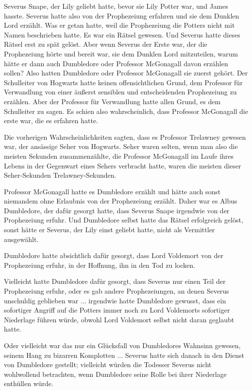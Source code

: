 Severus Snape, der Lily geliebt hatte, bevor sie Lily Potter war, und James
hasste. Severus hatte also von der Prophezeiung erfahren und sie dem Dunklen
Lord erzählt. Was er getan hatte, weil die Prophezeiung die Potters nicht mit
Namen beschrieben hatte. Es war ein Rätsel gewesen. Und Severus hatte dieses
Rätsel erst zu spät gelöst. Aber wenn Severus der Erste war, der die
Prophezeiung hörte und bereit war, sie dem Dunklen Lord mitzuteilen, warum hätte
er dann auch Dumbledore oder Professor McGonagall davon erzählen sollen? Also
hatten Dumbledore oder Professor McGonagall sie zuerst gehört. Der Schulleiter
von Hogwarts hatte keinen offensichtlichen Grund, dem Professor für Verwandlung
von einer äußerst sensiblen und entscheidenden Prophezeiung zu erzählen. Aber
der Professor für Verwandlung hatte allen Grund, es dem Schulleiter zu sagen. Es
schien also wahrscheinlich, dass Professor McGonagall die erste war, die es
erfahren hatte.

Die vorherigen Wahrscheinlichkeiten sagten, dass es Professor Trelawney gewesen
war, der ansässige Seher von Hogwarts. Seher waren selten, wenn man also die
meisten Sekunden zusammenzählte, die Professor McGonagall im Laufe ihres Lebens
in der Gegenwart eines Sehers verbracht hatte, waren die meisten dieser
Seher-Sekunden Trelawney-Sekunden.

Professor McGonagall hatte es Dumbledore erzählt und hätte auch sonst niemandem
ohne Erlaubnis von der Prophezeiung erzählt. Daher war es Albus Dumbledore, der
dafür gesorgt hatte, dass Severus Snape irgendwie von der Prophezeiung erfuhr.
Und Dumbledore selbst hatte das Rätsel erfolgreich gelöst, sonst hätte er
Severus, der Lily einst geliebt hatte, nicht als Vermittler ausgewählt.

Dumbledore hatte absichtlich dafür gesorgt, dass Lord Voldemort von der
Prophezeiung erfuhr, in der Hoffnung, ihn in den Tod zu locken.

Vielleicht hatte Dumbledore dafür gesorgt, dass Severus nur einen Teil der
Prophezeiung erfuhr, oder es gab andere Prophezeiungen, an denen Severus
unschuldig geblieben war ... irgendwie hatte Dumbledore gewusst, dass ein
sofortiger Angriff auf die Potters immer noch zu Lord Voldemorts sofortiger
Niederlage führen würde, obwohl Lord Voldemort selbst nicht daran geglaubt
hatte.

Oder vielleicht war das nur ein Glücksfall von Dumbledores Wahnsinn gewesen,
seinem Hang zu bizarren Komplotten ... Severus hatte sich danach in den Dienst
von Dumbledore gestellt; vielleicht würden die Todesser Severus nicht
wohlwollend betrachten, wenn Dumbledore seine Rolle bei ihrer Niederlage
enthüllen würde.

